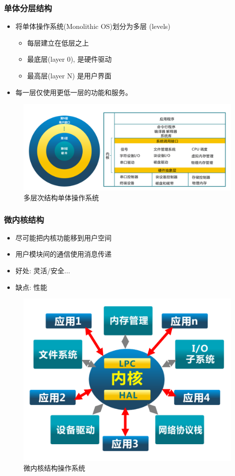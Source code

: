 \documentclass[UTF8]{ctexbeamer}
\begin{document}
\begin{frame}
	
	\frametitle{单体分层结构}
	
	\begin{itemize}
		\item 将单体操作系统(Monolithic OS)划分为多层 (levels)
		\begin{itemize}
			\item 每层建立在低层之上
			\item 最底层(layer 0), 是硬件驱动
			\item 最高层(layer N) 是用户界面
		\end{itemize}
	\item 每一层仅使用更低一层的功能和服务。
	\end{itemize}
	\begin{figure}
		\centering
		\includegraphics[width=0.6\linewidth]{multi-level-os-arch}
		\caption{多层次结构单体操作系统}
	\end{figure}
	
\end{frame}



\begin{frame}
	
	\frametitle{微内核结构}
	
	\begin{itemize}
		\item 尽可能把内核功能移到用户空间
		\item 用户模块间的通信使用消息传递
		\item 好处: 灵活/安全...
		\item 缺点: 性能
	\end{itemize}
	\begin{figure}
		\centering
		\includegraphics[width=0.6\linewidth]{microkernel-arch}
		\caption{微内核结构操作系统}
	\end{figure}
	
\end{frame}
\end{document}
